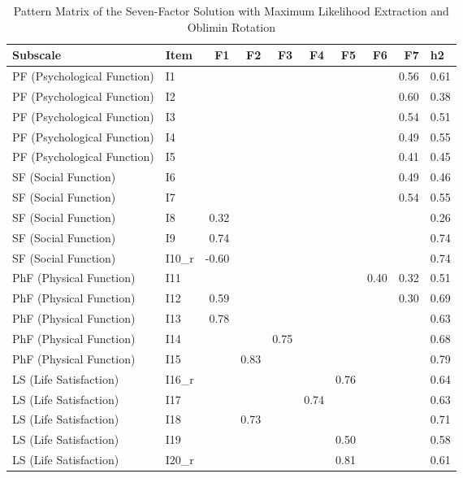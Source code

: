 \begin{table}[ht]
\centering
\caption{Pattern Matrix of the Seven-Factor Solution with Maximum Likelihood Extraction and Oblimin Rotation} 
\label{tab:pattern_matrix}
\begin{tabular}{llrrrrrrrl}
  \hline
Subscale & Item & F1 & F2 & F3 & F4 & F5 & F6 & F7 & h2 \\ 
  \hline
PF (Psychological Function) & I1 &  &  &  &  &  &  & 0.56 & 0.61 \\ 
  PF (Psychological Function) & I2 &  &  &  &  &  &  & 0.60 & 0.38 \\ 
  PF (Psychological Function) & I3 &  &  &  &  &  &  & 0.54 & 0.51 \\ 
  PF (Psychological Function) & I4 &  &  &  &  &  &  & 0.49 & 0.55 \\ 
  PF (Psychological Function) & I5 &  &  &  &  &  &  & 0.41 & 0.45 \\ 
  SF (Social Function) & I6 &  &  &  &  &  &  & 0.49 & 0.46 \\ 
  SF (Social Function) & I7 &  &  &  &  &  &  & 0.54 & 0.55 \\ 
  SF (Social Function) & I8 & 0.32 &  &  &  &  &  &  & 0.26 \\ 
  SF (Social Function) & I9 & 0.74 &  &  &  &  &  &  & 0.74 \\ 
  SF (Social Function) & I10_r & -0.60 &  &  &  &  &  &  & 0.74 \\ 
  PhF (Physical Function) & I11 &  &  &  &  &  & 0.40 & 0.32 & 0.51 \\ 
  PhF (Physical Function) & I12 & 0.59 &  &  &  &  &  & 0.30 & 0.69 \\ 
  PhF (Physical Function) & I13 & 0.78 &  &  &  &  &  &  & 0.63 \\ 
  PhF (Physical Function) & I14 &  &  & 0.75 &  &  &  &  & 0.68 \\ 
  PhF (Physical Function) & I15 &  & 0.83 &  &  &  &  &  & 0.79 \\ 
  LS (Life Satisfaction) & I16_r &  &  &  &  & 0.76 &  &  & 0.64 \\ 
  LS (Life Satisfaction) & I17 &  &  &  & 0.74 &  &  &  & 0.63 \\ 
  LS (Life Satisfaction) & I18 &  & 0.73 &  &  &  &  &  & 0.71 \\ 
  LS (Life Satisfaction) & I19 &  &  &  &  & 0.50 &  &  & 0.58 \\ 
  LS (Life Satisfaction) & I20_r &  &  &  &  & 0.81 &  &  & 0.61 \\ 

\end{tabular}
\end{table}
